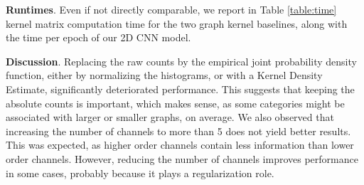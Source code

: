 \documentclass[runningheads]{llncs}
\begin{document}
\noindent \textbf{Runtimes}.
Even if not directly comparable, we report in Table \ref{table:time} kernel matrix computation time for the two graph kernel baselines, along with the time per epoch of our 2D CNN model.

\vspace{-0.45cm}

\begin{table*}[!h]
\begin{center}
\end{center}
\captionsetup{justification=centering, size=small}
\caption{Runtimes in seconds, rounded to the nearest integer. $^\star$without using node attributes}
\label{table:time}
\end{table*}

\vspace{-1cm}

\noindent \textbf{Discussion}. Replacing the raw counts by the empirical joint probability density function, either by normalizing the histograms, or with a Kernel Density Estimate, significantly deteriorated performance. This suggests that keeping the absolute counts is important, which makes sense, as some categories might be associated with larger or smaller graphs, on average. We also observed that increasing the number of channels to more than 5 does not yield better results. This was expected, as higher order channels contain less information than lower order channels. However, reducing the number of channels improves performance in some cases, probably because it plays a regularization role.
\end{document}
